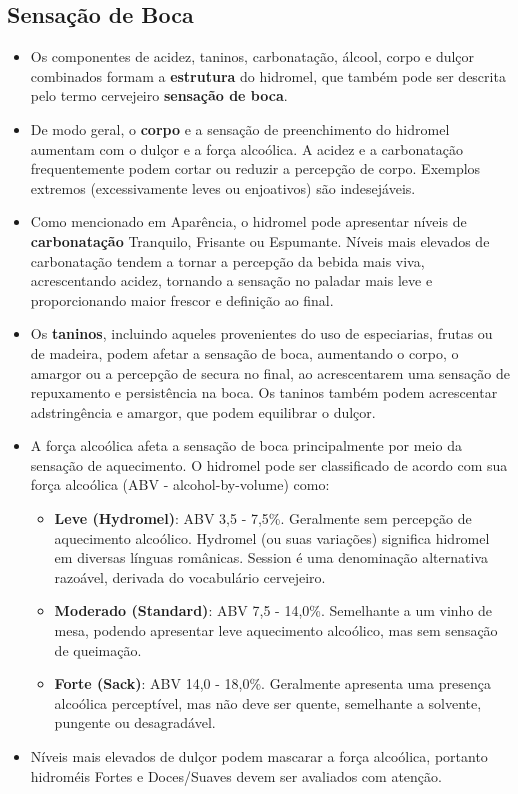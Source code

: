 
\subsection*{Sensação de Boca}

\begin{itemize}

\item Os componentes de acidez, taninos, carbonatação, álcool, corpo e dulçor combinados formam a \textbf{estrutura} do hidromel, que também pode ser descrita pelo termo cervejeiro \textbf{sensação de boca}.
\item De modo geral, o \textbf{corpo} e a sensação de preenchimento do hidromel aumentam com o dulçor e a força alcoólica. A acidez e a carbonatação frequentemente podem cortar ou reduzir a percepção de corpo. Exemplos extremos (excessivamente leves ou enjoativos) são indesejáveis.
\item Como mencionado em Aparência, o hidromel pode apresentar níveis de \textbf{carbonatação} Tranquilo, Frisante ou Espumante. Níveis mais elevados de carbonatação tendem a tornar a percepção da bebida mais viva, acrescentando acidez, tornando a sensação no paladar mais leve e proporcionando maior frescor e definição ao final.
\item Os \textbf{taninos}, incluindo aqueles provenientes do uso de especiarias, frutas ou de madeira, podem afetar a sensação de boca, aumentando o corpo, o amargor ou a percepção de secura no final, ao acrescentarem uma sensação de repuxamento e persistência na boca. Os taninos também podem acrescentar adstringência e amargor, que podem equilibrar o dulçor.
\item A força alcoólica afeta a sensação de boca principalmente por meio da sensação de aquecimento. O hidromel pode ser classificado de acordo com sua força alcoólica (ABV - alcohol-by-volume) como:

\begin{itemize}

\item \textbf{Leve (Hydromel)}: ABV 3,5 - 7,5\%. Geralmente sem percepção de aquecimento alcoólico. Hydromel (ou suas variações) significa hidromel em diversas línguas românicas. Session é uma denominação alternativa razoável, derivada do vocabulário cervejeiro.
\item \textbf{Moderado (Standard)}: ABV 7,5 - 14,0\%. Semelhante a um vinho de mesa, podendo apresentar leve aquecimento alcoólico, mas sem sensação de queimação.
\item \textbf{Forte (Sack)}: ABV 14,0 - 18,0\%. Geralmente apresenta uma presença alcoólica perceptível, mas não deve ser quente, semelhante a solvente, pungente ou desagradável.

\end{itemize}

\item Níveis mais elevados de dulçor podem mascarar a força alcoólica, portanto hidroméis Fortes e Doces/Suaves devem ser avaliados com atenção.

\end{itemize}